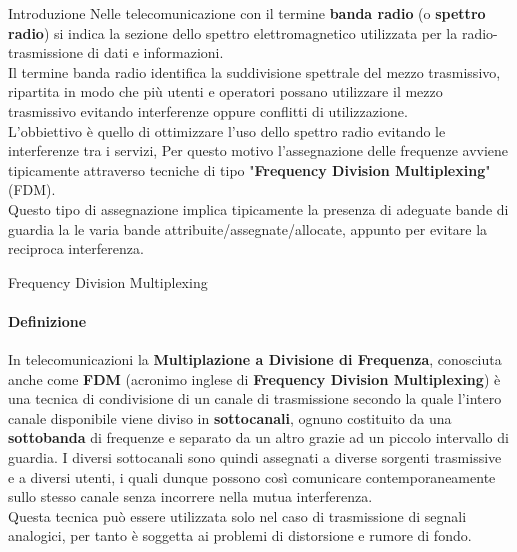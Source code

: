 \documentclass[aspectratio=169]{beamer}
\begin{document}
\begin{frame}{Introduzione}
	Nelle telecomunicazione con il termine \textbf{banda radio} (o \textbf{spettro radio}) si indica la sezione dello spettro elettromagnetico utilizzata per la radio-trasmissione di dati e informazioni.\\
	Il termine banda radio identifica la suddivisione spettrale del mezzo trasmissivo, ripartita in modo che più utenti e operatori possano utilizzare il mezzo trasmissivo evitando interferenze oppure conflitti di utilizzazione.\\
	\medskip
	L'obbiettivo è quello di ottimizzare l'uso dello spettro radio evitando le interferenze tra i servizi, Per questo motivo l'assegnazione delle frequenze avviene tipicamente attraverso tecniche di tipo "\textbf{Frequency Division Multiplexing}" (FDM).\\
	Questo tipo di assegnazione implica tipicamente la presenza di adeguate bande di guardia la le varia bande attribuite/assegnate/allocate, appunto per evitare la reciproca interferenza.
\end{frame}

\begin{frame}{Frequency Division Multiplexing}
	\framesubtitle{Definizione}
	In telecomunicazioni la \textbf{Multiplazione a Divisione di Frequenza}, conosciuta anche come \textbf{FDM} (acronimo inglese di \textbf{Frequency Division Multiplexing}) è una tecnica di condivisione di un canale di trasmissione secondo la quale l'intero canale disponibile viene diviso in \textbf{sottocanali}, ognuno costituito da una \textbf{sottobanda} di frequenze e separato da un altro grazie ad un piccolo intervallo di guardia. I diversi sottocanali sono quindi assegnati a diverse sorgenti trasmissive e a diversi utenti, i quali dunque possono così comunicare contemporaneamente sullo stesso canale senza incorrere nella mutua interferenza. \\
	\smallskip
	Questa tecnica può essere utilizzata solo nel caso di trasmissione di segnali analogici, per tanto è soggetta ai problemi di distorsione e rumore di fondo.\\
	\end{frame}
\end{document}
